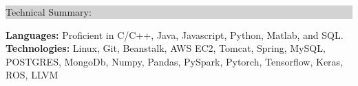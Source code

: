\documentclass{article} %
\newcommand{\rsection}[1]{
  \hspace{-0.4cm}\vspace{0.1cm}
\colorbox{lightgrey}{
\begin{minipage}{1.07\linewidth}
\vspace{0.22cm}
\fontsize{14pt}{16pt}\selectfont #1 
\vspace{0.12cm}
\end{minipage}
}
\vspace*{-0.1cm}
}
\begin{document}
\rsection{Technical Summary:}

\hspace*{-0.3cm}
\textbf{Languages:} Proficient in C/C++, Java, Javascript, Python, Matlab, and SQL. \\
\hspace*{-0.3cm}
\textbf{Technologies:} Linux, Git, Beanstalk, AWS EC2, Tomcat, Spring, MySQL, POSTGRES, MongoDb, Numpy, Pandas, PySpark, Pytorch, Tensorflow, Keras, ROS, LLVM
\end{document}
